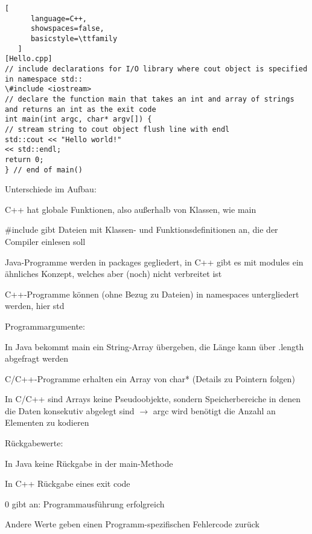 \documentclass[10pt]{article}
\begin{document}
\begin{lstlisting}[
      language=C++,
      showspaces=false,
      basicstyle=\ttfamily
   ]
[Hello.cpp]
// include declarations for I/O library where cout object is specified in namespace std::
\#include <iostream>
// declare the function main that takes an int and array of strings and returns an int as the exit code
int main(int argc, char* argv[]) {
// stream string to cout object flush line with endl
std::cout << "Hello world!"
<< std::endl;
return 0;
} // end of main()
\end{lstlisting}

\begin{itemize*}
  \item Unterschiede im Aufbau:
  \begin{itemize*}
    \item C++ hat globale Funktionen, also außerhalb von Klassen, wie main
    \item \#include gibt Dateien mit Klassen- und Funktionsdefinitionen an, die der Compiler einlesen soll
    \item Java-Programme werden in packages gegliedert, in C++ gibt es mit modules ein ähnliches Konzept, welches aber (noch) nicht verbreitet ist
    \item C++-Programme können (ohne Bezug zu Dateien) in namespaces untergliedert werden, hier std
  \end{itemize*}
  \item Programmargumente:
  \begin{itemize*}
    \item In Java bekommt main ein String-Array übergeben, die Länge kann über .length abgefragt werden
    \item C/C++-Programme erhalten ein Array von char* (Details zu Pointern folgen)
    \item In C/C++ sind Arrays keine Pseudoobjekte, sondern Speicherbereiche in denen die Daten konsekutiv abgelegt sind $\rightarrow$ argc wird benötigt die Anzahl an Elementen zu kodieren
  \end{itemize*}
  \item Rückgabewerte:
  \begin{itemize*}
    \item In Java keine Rückgabe in der main-Methode
    \item In C++ Rückgabe eines exit code
    \begin{itemize*}
      \item 0 gibt an: Programmausführung erfolgreich
      \item Andere Werte geben einen Programm-spezifischen Fehlercode zurück

\end{itemize*}
\end{itemize*}
\end{itemize*}
\end{document}
